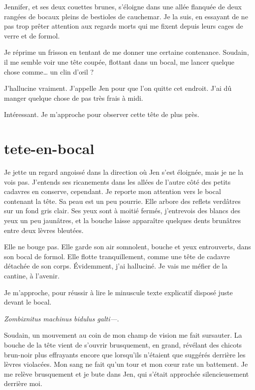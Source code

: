 Jennifer, et ses deux couettes brunes, s'éloigne dans une allée flanquée de deux rangées de bocaux pleins de bestioles de cauchemar. Je la suis, en essayant de ne pas trop prêter attention aux regards morts qui me fixent depuis leurs cages de verre et de formol.

Je réprime un frisson en tentant de me donner une certaine contenance. Soudain, il me semble voir une tête coupée, flottant dans un bocal, me lancer quelque chose comme… un clin d'œil ?

\item J'hallucine vraiment. J'appelle Jen pour que l'on quitte cet endroit. J'ai dû manger quelque chose de pas très frais à midi.
\item Intéressant. Je m'approche pour observer cette tête de plus près. 
\enw

\section{tete-en-bocal}

Je jette un regard angoissé dans la direction où Jen s'est éloignée, mais je ne la vois pas. J'entends ses ricanements dans les allées de l'autre côté des petits cadavres en conserve, cependant. Je reporte mon attention vers le bocal contenant la tête. Sa peau est un peu pourrie. Elle arbore des reflets verdâtres sur un fond gris clair. Ses yeux sont à moitié fermés, j'entrevois des blancs des yeux un peu jaunâtres, et la bouche laisse apparaître quelques dents brunâtres entre deux lèvres bleutées.

Elle ne bouge pas. Elle garde son air somnolent, bouche et yeux entrouverts, dans son bocal de formol. Elle flotte tranquillement, comme une tête de cadavre détachée de son corps. Évidemment, j'ai halluciné. Je vais me méfier de la cantine, à l'avenir.

Je m'approche, pour réussir à lire le minuscule texte explicatif disposé juste devant le bocal.

\textit{Zombixnitus machinus bidulus galti—}.

Soudain, un mouvement au coin de mon champ de vision me fait sursauter. La bouche de la tête vient de s'ouvrir brusquement, en grand, révélant des chicots brun-noir plus effrayants encore que lorsqu'ils n'étaient que suggérés derrière les lèvres violacées. Mon sang ne fait qu'un tour et mon cœur rate un battement. Je me relève brusquement et je bute dans Jen, qui s'était approchée silencieusement derrière moi.

